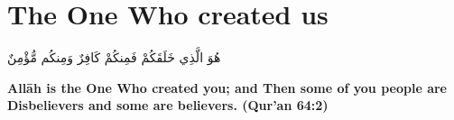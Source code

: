 \chapter{The One Who created us}
\begin{center}
    {\Huge    
        \begin{Arabic}
            هُوَ الَّذِي خَلَقَكُمْ فَمِنكُمْ كَافِرٌ وَمِنكُم مُّؤْمِنٌ
        \end{Arabic}
    }
\end{center}
\vspace*{\fill}
\vspace{3cm}
\begin{center}
    \large \textbf{Allāh is the One Who created you; and Then some of you people are Disbelievers and some are believers. (Qur'an 64:2)}
\end{center}
